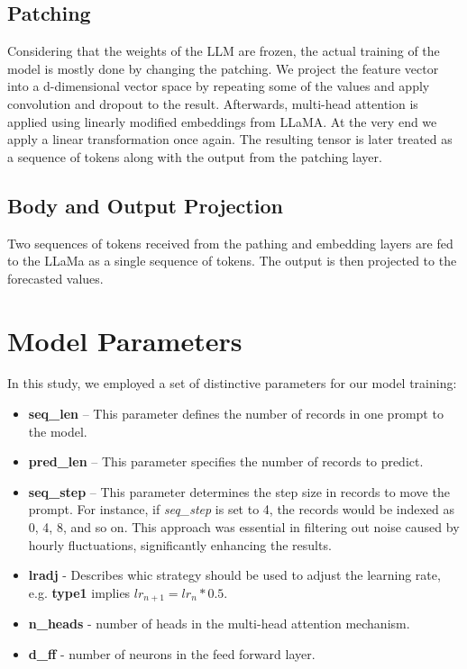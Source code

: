 \subsection{Patching} 

Considering that the weights of the LLM are frozen, the actual training of the model is mostly done by changing the patching. We project the feature vector into a d-dimensional vector space by repeating some of the values and apply convolution and dropout to the result. Afterwards, multi-head attention is applied using linearly modified embeddings from LLaMA. At the very end we apply a linear transformation once again. The resulting tensor is later treated as a sequence of tokens along with the output from the patching layer. \\ 

\subsection{Body and Output Projection}
Two sequences of tokens received from the pathing and embedding layers are fed to the LLaMa as a single sequence of tokens. The output is then projected to the forecasted values. \\ 

\section{Model Parameters}

In this study, we employed a set of distinctive parameters for our model training:

\begin{itemize}
    \item \textbf{seq\_len} – This parameter defines the number of records in one prompt to the model.
    \item \textbf{pred\_len} – This parameter specifies the number of records to predict.
    \item \textbf{seq\_step} – This parameter determines the step size in records to move the prompt. For instance, if \textit{seq\_step} is set to 4, the records would be indexed as 0, 4, 8, and so on. This approach was essential in filtering out noise caused by hourly fluctuations, significantly enhancing the results.
    \item \textbf{lradj} - Describes whic strategy should be used to adjust the learning rate, e.g. \textbf{type1} implies $lr_{n+1} = lr_{n} * 0.5$.
    \item \textbf{n\_heads} - number of heads in the multi-head attention mechanism.
    \item \textbf{d\_ff} - number of neurons in the feed forward layer.
\end{itemize}

